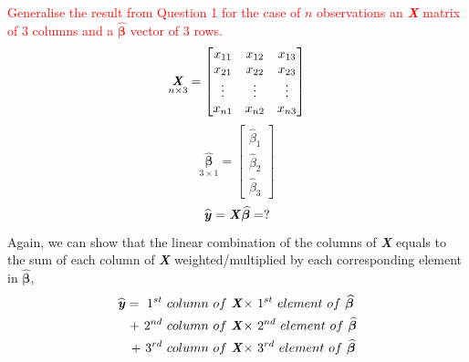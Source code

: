 \documentclass[12pt]{report}
\begin{document}
\noindent \textcolor{red}{Generalise the result from Question 1 for the case of $n$ observations an \textbf{\textit{X}} matrix of 3 columns and a $\widehat{\boldsymbol{\beta}}$ vector of 3 rows.}
{$$\underset{n\times3}{\textbf{\textit{X}}}
	=
	\begin{bmatrix}
	x_{11} & x_{12} & x_{13} \\
	x_{21} & x_{22} & x_{23} \\
	\vdots & \vdots & \vdots \\
	x_{n1} & x_{n2} & x_{n3} 
	\end{bmatrix}
$$}
{$$\underset{3\times1}{\widehat{\boldsymbol{\beta}}}
	=
	\begin{bmatrix}
	\hat{\beta}_1 \\
	\hat{\beta}_2 \\
	\hat{\beta}_3 
	\end{bmatrix}
$$}
{$$\widehat{\textbf{\textit{y}}}
	=
	{\textbf{\textit{X}}\widehat{\boldsymbol{\beta}}}
	=
	?
$$}
\justify 
Again, we can show that the linear combination of the columns of \textbf{\textit{X}} equals to the sum of each column of \textbf{\textit{X}} weighted/multiplied by each corresponding element in $\widehat{\boldsymbol{\beta}}$,
\begin{align*}
	\widehat{\textbf{\textit{y}}} =\ 1^{st}\ column\ of\ \textbf{\textit{X}} \times&\ 1^{st}\ element\ of\ \widehat{\boldsymbol{\beta}} \\
	+\ 2^{nd}\ column\ of\ \textbf{\textit{X}} \times&\ 2^{nd}\ element\ of\ \widehat{\boldsymbol{\beta}}\\
	+\ 3^{rd}\ column\ of\ \textbf{\textit{X}} \times&\ 3^{rd}\ element\ of\ \widehat{\boldsymbol{\beta}} 
\end{align*}
\end{document}
